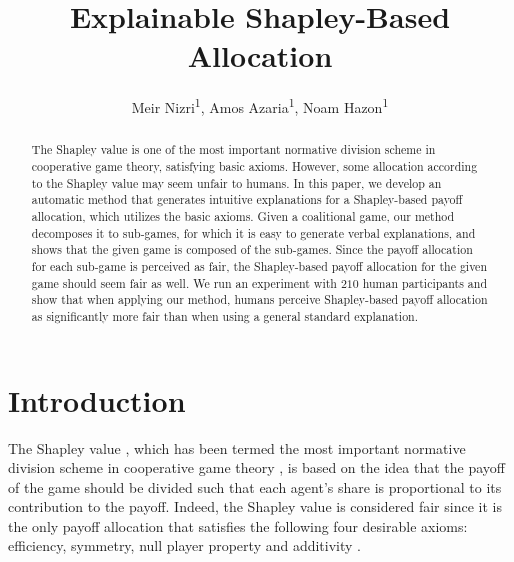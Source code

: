 \documentclass[letterpaper]{article} %
\title{Explainable Shapley-Based Allocation}
\author {
    Meir Nizri\textsuperscript{\rm 1},
    Amos Azaria\textsuperscript{\rm 1},
    Noam Hazon\textsuperscript{\rm 1}
}
\begin{document}
\maketitle


\begin{abstract}
The Shapley value is one of the most important normative division scheme in cooperative game theory, satisfying basic axioms. However, some allocation according to the Shapley value may seem unfair to humans.
In this paper, we develop an automatic method that generates intuitive explanations for a Shapley-based payoff allocation, which utilizes the basic axioms.
Given a coalitional game, our method decomposes it to sub-games, for which it is easy to generate verbal explanations, and shows that the given game is composed of the sub-games. 
Since the payoff allocation for each sub-game is perceived as fair, the Shapley-based payoff allocation for the given game should seem fair as well.
We run an experiment with $210$ human participants and show that when applying our method, humans perceive Shapley-based payoff allocation as significantly more fair than when using a general standard explanation.
\end{abstract}




\section{Introduction}

The Shapley value \cite{shapley1953value}, which has been termed the most important normative division scheme in cooperative game theory \cite{winter2002shapley},
is based on the idea that the payoff of the game should be divided such that each agent’s share is proportional to its contribution to the payoff. 
Indeed, the Shapley value is considered fair since it is the only payoff allocation that satisfies the following four desirable axioms: efficiency, symmetry, null player property and additivity \cite{hart1989shapley}. %
\end{document}

